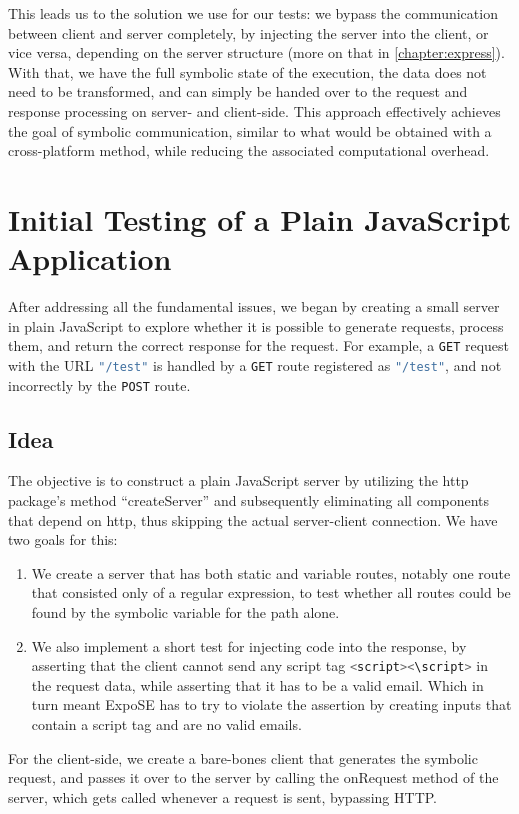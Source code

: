 This leads us to the solution we use for our tests: we bypass the communication between client and server completely, by injecting the server into the client, or vice versa, depending on the server structure (more on that in \autoref{chapter:express}). With that, we have the full symbolic state of the execution, the data does not need to be transformed, and can simply be handed over to the request and response processing on server- and client-side. 
This approach effectively achieves the goal of symbolic communication, similar to what would be obtained with a cross-platform method, while reducing the associated computational overhead.


\section{Initial Testing of a Plain JavaScript Application}
\label{sec:init-test-plain}
After addressing all the fundamental issues, we began by creating a small server in plain JavaScript to explore whether it is possible to generate requests, process them, and return the correct response for the request. For example, a \texttt{GET} request with the URL \lstinline[language=JavaScript]+"/test"+ is handled by a \texttt{GET} route registered as \lstinline[language=JavaScript]{"/test"}, and not incorrectly by the \texttt{POST} route. 

\subsection{Idea}
\label{sec:idea}

The objective is to construct a plain JavaScript server by utilizing the http package's method “createServer” and subsequently eliminating all components that depend on http, thus skipping the actual server-client connection.
We have two goals for this: 
\begin{enumerate}
    \item  We create a server that has both static and variable routes, notably one route that consisted only of a regular expression, to test whether all routes could be found by the symbolic variable for the path alone.
    \item  We also implement a short test for injecting code into the response, by asserting that the client cannot send any script tag \lstinline[language=JavaScript]{<script><\script>} in the request data, while asserting that it has to be a valid email. Which in turn meant ExpoSE has to try to violate the assertion by creating inputs that contain a script tag and are no valid emails. 
\end{enumerate}
For the client-side, we create a bare-bones client that generates the symbolic request, and passes it over to the server by calling the onRequest method of the server, which gets called whenever a request is sent, bypassing HTTP. 

